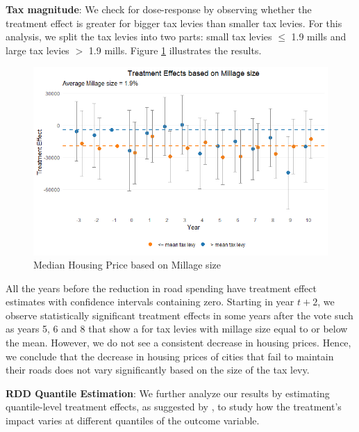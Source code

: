 \vskip 1cm

\textbf{Tax magnitude}: We check for dose-response by observing whether the treatment effect is greater for bigger tax levies than smaller tax levies. For this analysis, we split the tax levies into two parts: small tax levies $\le$ 1.9 mills and large tax levies $>$ 1.9 mills. Figure \ref{fig:tes_covs_size} illustrates the results.

\begin{figure}[htbp]
    \centering
    \includegraphics[width=\textwidth,keepaspectratio]{images/tes_size_re.png}    
    \caption{Median Housing Price based on Millage size}
    \label{fig:tes_covs_size}
\end{figure}

All the years before the reduction in road spending have treatment effect estimates with confidence intervals containing zero. Starting in year $t+2$, we observe statistically significant treatment effects in some years after the vote such as years 5, 6 and 8 that show a for tax levies with millage size equal to or below the mean. However, we do not see a consistent decrease in housing prices. Hence, we conclude that the decrease in housing prices of cities that fail to maintain their roads does not vary significantly based on the size of the tax levy.

\vskip 1cm

\textbf{RDD Quantile Estimation}: We further analyze our results by estimating quantile-level treatment effects, as suggested by \cite{FRANDSEN2012}, to study how the treatment’s impact varies at different quantiles of the outcome variable. 

